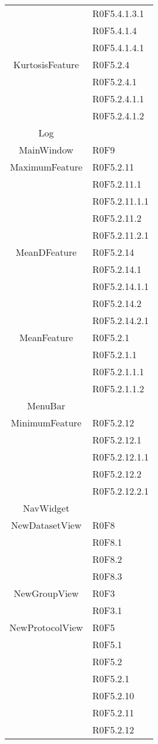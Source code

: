 \begin{center}
\begin{longtable}{|c|l|}
 & R0F5.4.1.3.1 \\
 & R0F5.4.1.4 \\
 & R0F5.4.1.4.1 \\
\hline 
KurtosisFeature & R0F5.2.4 \\
 & R0F5.2.4.1 \\
 & R0F5.2.4.1.1 \\
 & R0F5.2.4.1.2 \\
\hline 
Log &  \\
\hline 
MainWindow & R0F9 \\
\hline 
MaximumFeature & R0F5.2.11 \\
 & R0F5.2.11.1 \\
 & R0F5.2.11.1.1 \\
 & R0F5.2.11.2 \\
 & R0F5.2.11.2.1 \\
\hline 
MeanDFeature & R0F5.2.14 \\
 & R0F5.2.14.1 \\
 & R0F5.2.14.1.1 \\
 & R0F5.2.14.2 \\
 & R0F5.2.14.2.1 \\
\hline 
MeanFeature & R0F5.2.1 \\
 & R0F5.2.1.1 \\
 & R0F5.2.1.1.1 \\
 & R0F5.2.1.1.2 \\
\hline 
MenuBar &  \\
\hline 
MinimumFeature & R0F5.2.12 \\
 & R0F5.2.12.1 \\
 & R0F5.2.12.1.1 \\
 & R0F5.2.12.2 \\
 & R0F5.2.12.2.1 \\
\hline 
NavWidget &  \\
\hline 
NewDatasetView & R0F8 \\
 & R0F8.1  \\
 & R0F8.2 \\
 & R0F8.3  \\
\hline 
NewGroupView & R0F3 \\
 & R0F3.1 \\
\hline 
NewProtocolView & R0F5 \\
 & R0F5.1  \\
 & R0F5.2  \\
 & R0F5.2.1 \\
 & R0F5.2.10 \\
 & R0F5.2.11 \\
 & R0F5.2.12 \\

\end{longtable}
\end{center}
